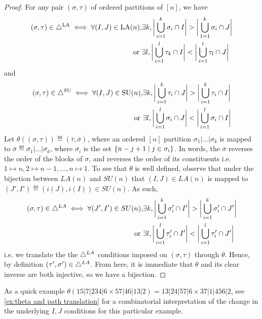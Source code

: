 \begin{proof}
For any pair $(\sigma,\tau)$ of ordered partitions of $[n]$, we have
\begin{align*}
    (\sigma,\tau)\in \triangle^{\mathrm{LA}}
    \iff  \forall (I,J) \in \mathrm{LA}(n), &\exists k, \bigg| \bigcup_{i=1}^k \sigma_i \cap I \bigg| > \bigg|\bigcup_{1=1}^k \sigma_i \cap J \bigg|
    \\
    \text{ or } 
    &\exists l, \bigg| \bigcup_{i=1}^l \tau_k \cap I \bigg| < \bigg|\bigcup_{i=1}^l \tau_l \cap J \bigg|
\end{align*}
and 
\begin{align*}
    (\sigma,\tau)\in \triangle^{\mathrm{SU}}
    \iff  \forall (I,J) \in \mathrm{SU}(n),
    &\exists k, \bigg| \bigcup_{i=1}^{k} \tau_{i} \cap J \bigg| > \bigg|\bigcup_{i=1}^{k}\tau_{i} \cap I \bigg|
    \\
    \text{ or } 
    &\exists l, \bigg| \bigcup_{i=1}^{l} \sigma_{i} \cap J \bigg| < \bigg|\bigcup_{i=1}^{l} \sigma_{i} \cap I \bigg|    
\end{align*}
Let $\theta ((\sigma,\tau))  \eqdef  (\overline{\tau},\overline{\sigma})$, where an ordered $[n]$ partition $\sigma_1|\dots|\sigma_k$ is mapped to $\overline{\sigma} \eqdef \overline{\sigma_{1}} | \ldots | \overline{\sigma_{k}}$, where $\overline{\sigma_i}$ is the set $\left\{ n-j+1 \;\middle|\; j \in \sigma_i \right\}$. In words, the $\overline{\sigma}$ reverses the order of the blocks of $\sigma$, and reverses the order of its constituents i.e. $1\mapsto n,2 \mapsto n-1,\dots,n\mapsto 1$. To see that $\theta$ is well defined, observe that under the bijection between $LA(n)$ and $SU(n)$ that $(I,J) \in LA(n)$ is mapped to $(J',I') \eqdef (i(J),i(I)) \in SU(n)$. As such,
\begin{align*}
    (\sigma,\tau)\in \triangle^{LA}
    \iff  \forall (J',I') \in SU(n), 
    &\exists k, \bigg| \bigcup_{i=1}^{k} \sigma'_{i} \cap I' \bigg| > \bigg|\bigcup_{i=1}^{k} \sigma'_{i} \cap J' \bigg|
    \\
    \text{ or } 
    &\exists l, \bigg| \bigcup_{i=1}^{l} \tau'_{i} \cap I' \bigg| < \bigg|\bigcup_{i=1}^{l} \tau'_{i} \cap J' \bigg|
\end{align*}
i.e. we translate the the $\triangle^{LA}$ conditions imposed on $(\sigma,\tau)$ through $\theta$. Hence, by definition $(\tau',\sigma')\in \triangle^{LA}$. From here, it is immediate that $\theta$ and its clear inverse are both injective, so we have a bijection.
\end{proof}
As a quick example $\theta(15|7|234|6\times 57|46|13|2)=13|24|57|6\times 37|1|456|2$, see \cref{ex:theta and path translation} for a combinatorial interpretation of the change in the underlying $I,J$ conditions for this particular example.

